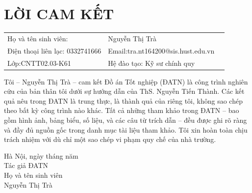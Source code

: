 \documentclass{article}
\begin{document}
\section*{LỜI CAM KẾT}
\begin{table}[H]
    \begin{tabular}{l l l}
     \fontsize{13pt}{0pt}\selectfont Họ và tên sinh viên:& \fontsize{13pt}{0pt}\selectfont Nguyễn Thị Trà \vspace{6pt}\\
     \fontsize{13pt}{0pt}\selectfont Điện thoại liên lạc: 0332741666& \fontsize{13pt}{0pt}\selectfont Email:tra.nt164200@sis.hust.edu.vn \vspace{6pt}\\
     \fontsize{13pt}{0pt}\selectfont Lớp:CNTT02.03-K61& \fontsize{13pt}{0pt}\selectfont Hệ đào tạo: Kỹ sư chính quy
    \end{tabular}
\end{table}
Tôi – Nguyễn Thị Trà – cam kết Đồ án Tốt nghiệp (ĐATN) là công trình nghiên cứu của bản thân tôi dưới sự hướng dẫn của ThS. Nguyễn Tiến Thành. Các kết quả nêu trong ĐATN là trung thực, là thành quả của riêng tôi, không sao chép theo bất kỳ công trình nào khác. Tất cả những tham khảo trong ĐATN – bao gồm hình ảnh, bảng biểu, số liệu, và các câu từ trích dẫn – đều được ghi rõ ràng và đầy đủ nguồn gốc trong danh mục tài liệu tham khảo. Tôi xin hoàn toàn chịu trách nhiệm với dù chỉ một sao chép vi phạm quy chế của nhà trường.
\vspace{6pt}	

\hspace{6cm} Hà Nội, ngày    tháng    năm\\

\hspace{6.5cm} {Tác giả ĐATN}\\

\hspace{6.3cm} Họ và tên sinh viên\\

\hspace{6.5cm} Nguyễn Thị Trà

\newpage

\thispagestyle{empty}

\end{document}

